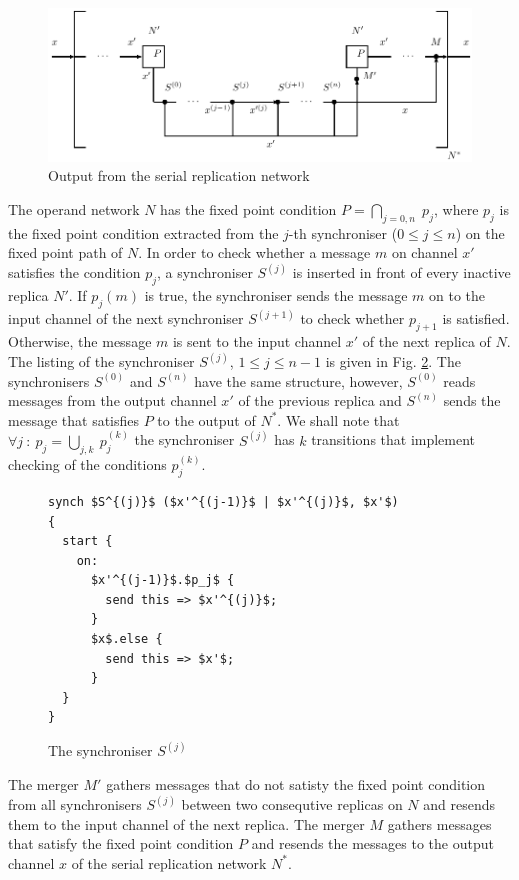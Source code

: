 \begin{figure}[h!]
\centering
\includegraphics[scale=0.8]{figs/chapter_04_ffp_out.pdf}
\caption{Output from the serial replication network}
\label{fig:ffp_out}
\end{figure}

The operand network $N$ has the fixed point condition $P = \underset{j=0,n}{\bigcap} \; p_j$, where $p_j$ is the fixed point condition extracted from the $j$-th synchroniser ($0 \leq j \leq n$) on the fixed point path of $N$. In order to check whether a message $m$ on channel $x'$ satisfies the condition $p_j$, a synchroniser $S^{(j)}$ is inserted in front of every inactive replica $N'$. If $p_{j}(m)$ is true, the synchroniser sends the message $m$ on to the input channel of the next synchroniser $S^{(j+1)}$ to check whether $p_{j+1}$ is satisfied. Otherwise, the message $m$ is sent to the input channel $x'$ of the next replica of $N$. The listing of the synchroniser $S^{(j)}$, $1 \leq j \leq n-1$ is given in Fig. \ref{ffp:synch_filt}. The synchronisers $S^{(0)}$ and $S^{(n)}$ have the same structure, however, $S^{(0)}$ reads messages from the output channel $x'$ of the previous replica and $S^{(n)}$ sends the message that satisfies $P$ to the output of $N^{*}$. We shall note that $\forall j \: : \: p_j = \underset{j,k}{\bigcup} \: p^{(k)}_j$ the synchroniser $S^{(j)}$ has $k$ transitions that implement checking of the conditions $p^{(k)}_j$.
\begin{figure}[h!]
\begin{lstlisting}[frame=single,mathescape]
synch $S^{(j)}$ ($x'^{(j-1)}$ | $x'^{(j)}$, $x'$)
{
  start {
    on:
      $x'^{(j-1)}$.$p_j$ {
        send this => $x'^{(j)}$;
      }
      $x$.else {
        send this => $x'$;
      }
  }
}
\end{lstlisting}
\caption{The synchroniser $S^{(j)}$}
\label{ffp:synch_filt}
\end{figure}

The merger $M'$ gathers messages that do not satisty the fixed point condition from all synchronisers $S^{(j)}$ between two consequtive replicas on $N$ and resends them to the input channel of the next replica. The merger $M$ gathers messages that satisfy the fixed point condition $P$ and resends the messages to the output channel $x$ of the serial replication network $N^{*}$.

